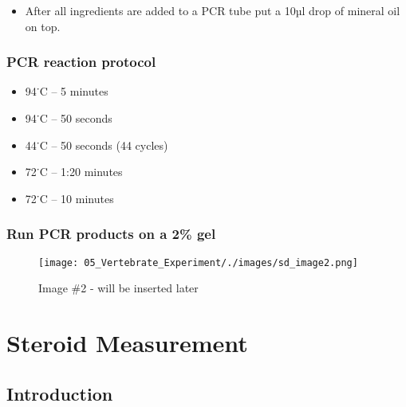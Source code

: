 \documentclass[
  letterpaper,
  DIV=11,
  numbers=noendperiod]{scrreprt}
\providecommand{\tightlist}{%
  \setlength{\itemsep}{0pt}\setlength{\parskip}{0pt}}\usepackage{longtable,booktabs,array}
\begin{document}
\begin{itemize}
\tightlist
\item
  After all ingredients are added to a PCR tube put a 10µl drop of
  mineral oil on top.
\end{itemize}

\hypertarget{pcr-reaction-protocol}{%
\subsection{PCR reaction protocol}\label{pcr-reaction-protocol}}

\begin{itemize}
\tightlist
\item
  94˙C -- 5 minutes
\item
  94˙C -- 50 seconds
\item
  44˙C -- 50 seconds (44 cycles)
\item
  72˙C -- 1:20 minutes
\item
  72˙C -- 10 minutes
\end{itemize}

\hypertarget{run-pcr-products-on-a-2-gel}{%
\subsection{Run PCR products on a 2\%
gel}\label{run-pcr-products-on-a-2-gel}}

\begin{figure}

{\centering \texttt{[image: 05\_Vertebrate\_Experiment/./images/sd\_image2.png]}

}

\caption{Image \#2 - will be inserted later}

\end{figure}

\hypertarget{sec-vert_exp-steroid_measure}{%
\chapter{Steroid Measurement}\label{sec-vert_exp-steroid_measure}}

\hypertarget{introduction-84}{%
\section{Introduction}\label{introduction-84}}
\end{document}
